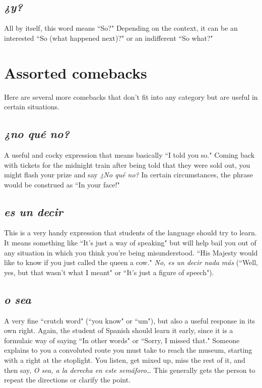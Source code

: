 \subsection{\emph{¿y?}}

All by itself, this word means ``So?" Depending on the context,
it can be an interested ``So (what happened next)?" or an indifferent
``So what?"

\section{Assorted comebacks}

Here are several more comebacks that don't fit into any category but are useful in certain situations.

\subsection{\emph{¿no qué no?}}

A useful and cocky expression that means basically ``I told you
so." Coming back with tickets for the midnight train after being told
that they were sold out, you might flash your prize and say \emph{¿No qué
	no?} In certain circumstances, the phrase would be construed as ``In
your face!"

\subsection{\emph{es un decir}}

This is a very handy expression that students of the language
should try to learn. It means something like ``It's just a way of speaking" but will help bail you out of any situation in which you think
you're being misunderstood. ``His Majesty would like to know if you
just called the queen a cow." \emph{No, es un decir nada más} (``Well, yes, but
that wasn't what I meant" or ``It's just a figure of speech").

\subsection{\emph{o sea}}

A very fine ``crutch word" (``you know" or ``um"), but also a
useful response in its own right. Again, the student of Spanish should
learn it early, since it is a formulaic way of saying ``In other words" or
``Sorry, I missed that." Someone explains to you a convoluted route
you must take to reach the museum, starting with a right at the stoplight. You listen, get mixed up, miss the rest of it, and then say, \emph{O sea,
	a la derecha en este semáforo}\ldots{} This generally gets the person to
repeat the directions or clarify the point.

